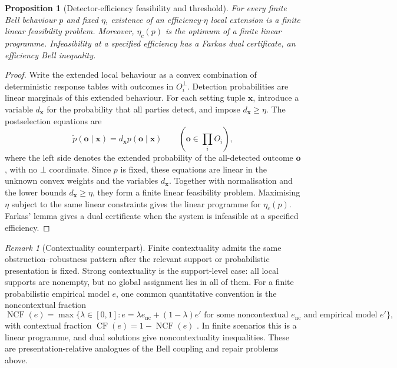 \documentclass[11pt]{article}
\theoremstyle{plain}
\newtheorem{proposition}[theorem]{Proposition}
\theoremstyle{definition}
\theoremstyle{remark}
\newtheorem{remark}[theorem]{Remark}
\begin{document}
\begin{proposition}[Detector-efficiency feasibility and threshold]
\label{prop:detector-certificate}
For every finite Bell behaviour \(p\) and fixed \(\eta\), existence of an
efficiency-\(\eta\) local extension is a finite linear feasibility problem.
Moreover, \(\eta_c(p)\) is the optimum of a finite linear programme. Infeasibility
at a specified efficiency has a Farkas dual certificate, an efficiency Bell
inequality.
\end{proposition}

\begin{proof}
Write the extended local behaviour as a convex combination of deterministic
response tables with outcomes in \(O_i^\bot\). Detection probabilities are linear
marginals of this extended behaviour. For each setting tuple \(\mathbf x\),
introduce a variable \(d_{\mathbf x}\) for the probability that all parties
detect, and impose \(d_{\mathbf x}\ge\eta\). The postselection equations are
\[
\widetilde p(\mathbf o\mid\mathbf x)
=d_{\mathbf x}p(\mathbf o\mid\mathbf x)
\qquad(\mathbf o\in\prod_iO_i),
\]
where the left side denotes the extended probability of the all-detected outcome
\(\mathbf o\), with no \(\bot\) coordinate. Since \(p\) is fixed, these equations
are linear in the unknown convex weights and the variables \(d_{\mathbf x}\).
Together with normalisation and the lower bounds \(d_{\mathbf x}\ge\eta\), they
form a finite linear feasibility problem. Maximising \(\eta\) subject to the same
linear constraints gives the linear programme for \(\eta_c(p)\). Farkas' lemma
gives a dual certificate when the system is infeasible at a specified efficiency.
\end{proof}

\begin{remark}[Contextuality counterpart]
Finite contextuality admits the same obstruction--robustness pattern after the
relevant support or probabilistic presentation is fixed. Strong contextuality is
the support-level case: all local supports are nonempty, but no global assignment
lies in all of them. For a finite probabilistic empirical model \(e\), one common
quantitative convention is the noncontextual fraction
\[
\operatorname{NCF}(e)=
\max\{\lambda\in[0,1]: e=\lambda e_{\mathrm{nc}}+(1-\lambda)e'
\text{ for some noncontextual }e_{\mathrm{nc}}\text{ and empirical model }e'\},
\]
with contextual fraction \(\operatorname{CF}(e)=1-\operatorname{NCF}(e)\)
\cite{contextualfraction}. In finite scenarios this is a linear programme, and
dual solutions give noncontextuality inequalities. These are
presentation-relative analogues of the Bell coupling and repair problems above.
\end{remark}
\end{document}

